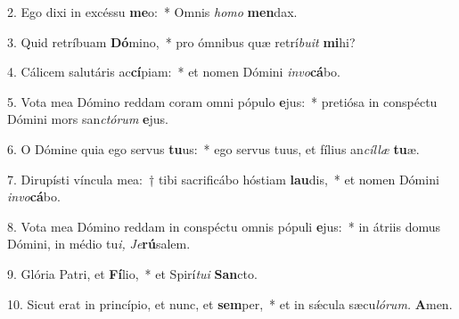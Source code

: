 \item 2. Ego dixi in excéssu \textbf{me}o:~* Omnis \textit{homo} \textbf{men}dax.
\item 3. Quid retríbuam \textbf{Dó}mino,~* pro ómnibus quæ retrí\textit{buit} \textbf{mi}hi?
\item 4. Cálicem salutáris ac\textbf{cí}piam:~* et nomen Dómini \textit{invo}\textbf{cá}bo.
\item 5. Vota mea Dómino reddam coram omni pópulo \textbf{e}jus:~* pretiósa in conspé\-ctu Dómini mors san\textit{ctórum} \textbf{e}jus.
\item 6. O Dómine quia ego servus \textbf{tu}us:~* ego servus tuus, et fílius an\textit{cíllæ} \textbf{tu}æ.
\item 7. Dirupísti víncula mea:~† tibi sacrificábo hóstiam \textbf{lau}dis,~* et nomen Dómini \textit{invo}\textbf{cá}bo.
\item 8. Vota mea Dómino reddam in conspéctu omnis pópuli \textbf{e}jus:~* in átriis domus Dómini, in médio tu\hspace{0.03em}\textit{i,} \hspace{0.02em}\textit{Je}\textbf{rú}salem.
\item 9. Glória Patri, et \textbf{Fí}lio,~* et Spirí\hspace{0.03em}\textit{tui} \textbf{San}cto.
\item 10. Sicut erat in princípio, et nunc, et \textbf{sem}per,~* et in sǽcula sæcu\hspace{0.03em}\textit{lórum.} \textbf{A}men.
